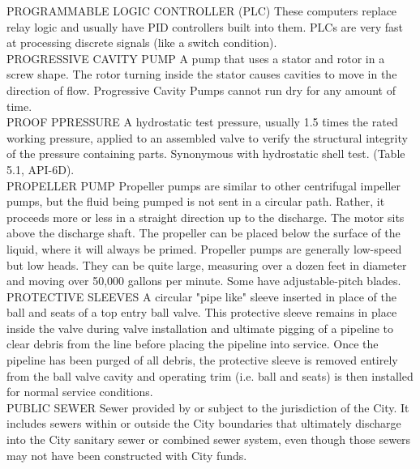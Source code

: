 PROGRAMMABLE LOGIC CONTROLLER (PLC)
These computers replace relay logic and usually have PID controllers built into them. PLCs are very fast at processing discrete signals (like a switch condition).
\vspace{0.3cm}\\
PROGRESSIVE CAVITY PUMP
A pump that uses a stator and rotor in a screw shape. The rotor turning inside the stator causes cavities to move in the direction of flow. Progressive Cavity Pumps cannot run dry for any amount of time.
\vspace{0.3cm}\\
PROOF PPRESSURE
A hydrostatic test pressure, usually 1.5 times the rated working pressure, applied to an assembled valve to verify the structural integrity of the pressure containing parts. Synonymous with hydrostatic shell test. (Table 5.1, API-6D).
\vspace{0.3cm}\\
PROPELLER PUMP
Propeller pumps are similar to other centrifugal impeller pumps, but the fluid being pumped is not sent in a circular path. Rather, it proceeds more or less in a straight direction up to the discharge. The motor sits above the discharge shaft. The propeller can be placed below the surface of the liquid, where it will always be primed. Propeller pumps are generally low-speed but low heads. They can be quite large, measuring over a dozen feet in diameter and moving over 50,000 gallons per minute. Some have adjustable-pitch blades.
\vspace{0.3cm}\\
PROTECTIVE SLEEVES
A circular "pipe like" sleeve inserted in place of the ball and seats of a top entry ball valve. This protective sleeve remains in place inside the valve during valve installation and ultimate pigging of a pipeline to clear debris from the line before placing the pipeline into service. Once the pipeline has been purged of all debris, the protective sleeve is removed entirely from the ball valve cavity and operating trim (i.e. ball and seats) is then installed for normal service conditions.
\vspace{0.3cm}\\
PUBLIC SEWER
Sewer provided by or subject to the jurisdiction of the City. It includes sewers within or outside the City boundaries that ultimately discharge into the City sanitary sewer or combined sewer system, even though those sewers may not have been constructed with City funds.
\vspace{0.3cm}\\

